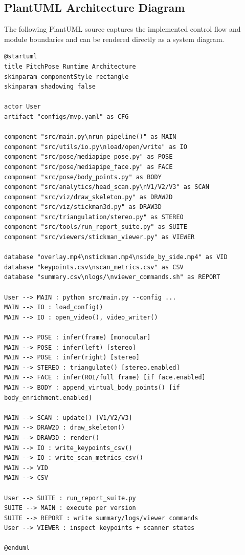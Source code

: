 \documentclass[11pt,a4paper]{article}
\begin{document}
\subsection{PlantUML Architecture Diagram}
The following PlantUML source captures the implemented control flow and module boundaries and can be rendered directly as a system diagram.

\begin{lstlisting}
@startuml
title PitchPose Runtime Architecture
skinparam componentStyle rectangle
skinparam shadowing false

actor User
artifact "configs/mvp.yaml" as CFG

component "src/main.py\nrun_pipeline()" as MAIN
component "src/utils/io.py\nload/open/write" as IO
component "src/pose/mediapipe_pose.py" as POSE
component "src/pose/mediapipe_face.py" as FACE
component "src/pose/body_points.py" as BODY
component "src/analytics/head_scan.py\nV1/V2/V3" as SCAN
component "src/viz/draw_skeleton.py" as DRAW2D
component "src/viz/stickman3d.py" as DRAW3D
component "src/triangulation/stereo.py" as STEREO
component "src/tools/run_report_suite.py" as SUITE
component "src/viewers/stickman_viewer.py" as VIEWER

database "overlay.mp4\nstickman.mp4\nside_by_side.mp4" as VID
database "keypoints.csv\nscan_metrics.csv" as CSV
database "summary.csv\nlogs/\nviewer_commands.sh" as REPORT

User --> MAIN : python src/main.py --config ...
MAIN --> IO : load_config()
MAIN --> IO : open_video(), video_writer()

MAIN --> POSE : infer(frame) [monocular]
MAIN --> POSE : infer(left) [stereo]
MAIN --> POSE : infer(right) [stereo]
MAIN --> STEREO : triangulate() [stereo.enabled]
MAIN --> FACE : infer(ROI/full frame) [if face.enabled]
MAIN --> BODY : append_virtual_body_points() [if body_enrichment.enabled]

MAIN --> SCAN : update() [V1/V2/V3]
MAIN --> DRAW2D : draw_skeleton()
MAIN --> DRAW3D : render()
MAIN --> IO : write_keypoints_csv()
MAIN --> IO : write_scan_metrics_csv()
MAIN --> VID
MAIN --> CSV

User --> SUITE : run_report_suite.py
SUITE --> MAIN : execute per version
SUITE --> REPORT : write summary/logs/viewer commands
User --> VIEWER : inspect keypoints + scanner states

@enduml
\end{lstlisting}
\end{document}
